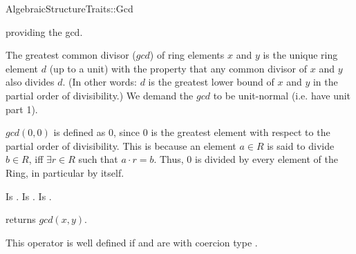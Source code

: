 \begin{ccRefConcept}{AlgebraicStructureTraits::Gcd}

\ccDefinition

 providing the gcd. 

The greatest common divisor ($gcd$) of ring elements $x$ and $y$ is the unique 
ring element $d$ (up to a unit) with the property that any common divisor of 
$x$ and $y$ also divides $d$. (In other words: $d$ is the greatest lower bound 
of $x$ and $y$ in the partial order of divisibility.) We demand the $gcd$ to be 
unit-normal (i.e. have unit part 1). 

$gcd(0,0)$ is defined as $0$, since $0$ is the greatest element with respect 
to the partial order of divisibility. This is because an element $a \in R$ is said to divide $b \in R$, iff $\exists r \in R$ such that $a \cdot r = b$. 
Thus, $0$ is divided by every element of the Ring, in particular by itself. 

\ccRefines 


\ccTypes
{} 
        { Is .}
\ccGlue
{} 
        { Is .}
\ccGlue
{} 
        { Is .}

\ccOperations
{}

        { returns  $gcd(x,y)$. }

         {This operator is well defined if  and  are  
          with coercion type . }


\ccSeeAlso


\end{ccRefConcept} 

